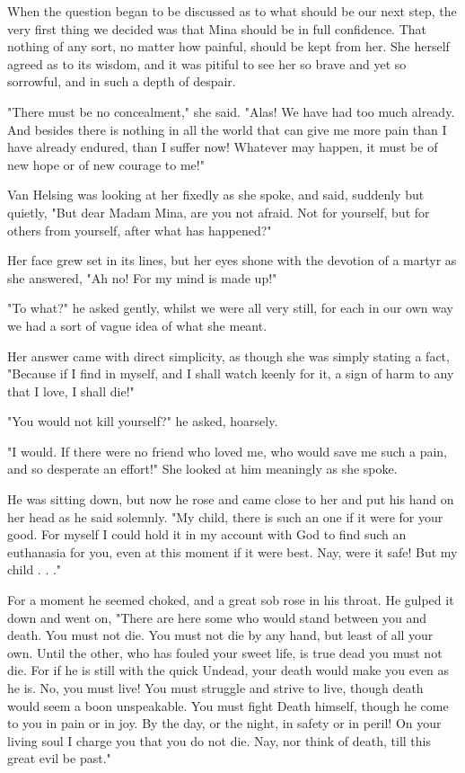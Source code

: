 When the question began to be discussed as to what should be our next step, the very first thing we decided was that Mina should be in full confidence. That nothing of any sort, no matter how painful, should be kept from her. She herself agreed as to its wisdom, and it was pitiful to see her so brave and yet so sorrowful, and in such a depth of despair. 

"There must be no concealment," she said. "Alas! We have had too much already. And besides there is nothing in all the world that can give me more pain than I have already endured, than I suffer now! Whatever may happen, it must be of new hope or of new courage to me!" 

Van Helsing was looking at her fixedly as she spoke, and said, suddenly but quietly, "But dear Madam Mina, are you not afraid. Not for yourself, but for others from yourself, after what has happened?" 

Her face grew set in its lines, but her eyes shone with the devotion of a martyr as she answered, "Ah no! For my mind is made up!" 

"To what?" he asked gently, whilst we were all very still, for each in our own way we had a sort of vague idea of what she meant. 

Her answer came with direct simplicity, as though she was simply stating a fact, "Because if I find in myself, and I shall watch keenly for it, a sign of harm to any that I love, I shall die!" 

"You would not kill yourself?" he asked, hoarsely. 

"I would. If there were no friend who loved me, who would save me such a pain, and so desperate an effort!" She looked at him meaningly as she spoke. 

He was sitting down, but now he rose and came close to her and put his hand on her head as he said solemnly. "My child, there is such an one if it were for your good. For myself I could hold it in my account with God to find such an euthanasia for you, even at this moment if it were best. Nay, were it safe! But my child . . ." 

For a moment he seemed choked, and a great sob rose in his throat. He gulped it down and went on, "There are here some who would stand between you and death. You must not die. You must not die by any hand, but least of all your own. Until the other, who has fouled your sweet life, is true dead you must not die. For if he is still with the quick Undead, your death would make you even as he is. No, you must live! You must struggle and strive to live, though death would seem a boon unspeakable. You must fight Death himself, though he come to you in pain or in joy. By the day, or the night, in safety or in peril! On your living soul I charge you that you do not die. Nay, nor think of death, till this great evil be past." 


